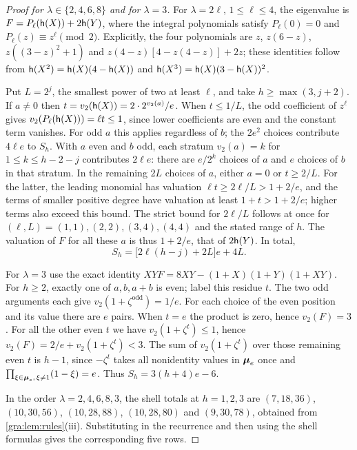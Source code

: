 \begin{proof}[Proof for $\lambda\in\{2,4,6,8\}$ and for $\lambda=3$]
For $\lambda=2\ell$, $1\le\ell\le4$, the eigenvalue is
$F=P_\ell(\mathsf{h}(X))+2\mathsf{h}(Y)$, where the integral polynomials satisfy
$P_\ell(0)=0$ and $P_\ell(z)\equiv z^\ell\pmod2$. Explicitly, the four
polynomials are $z$, $z(6-z)$, $z((3-z)^2+1)$ and $z(4-z)[4-z(4-z)]+2z$;
these identities follow from $\mathsf{h}(X^2)=\mathsf{h}(X)(4-\mathsf{h}(X))$ and
$\mathsf{h}(X^3)=\mathsf{h}(X)(3-\mathsf{h}(X))^2$.

Put $L=2^j$, the smallest power of two at least $\ell$, and take
$h\ge\max(3,j+2)$. If $a\ne0$ then
$t=v_2(\mathsf{h}(X))=2\cdot2^{v_2(a)}/e$. When $t\le1/L$, the odd coefficient
of $z^\ell$ gives $v_2(P_\ell(\mathsf{h}(X)))=\ell t\le1$, since lower
coefficients are even and the constant term vanishes. For odd $a$ this
applies regardless of $b$; the $2e^2$ choices contribute $4\ell e$ to
$S_h$. With $a$ even and $b$ odd, each stratum $v_2(a)=k$ for
$1\le k\le h-2-j$ contributes $2\ell e$: there are $e/2^k$ choices of $a$
and $e$ choices of $b$ in that stratum. In the remaining $2L$ choices of
$a$, either $a=0$ or $t\ge2/L$. For the latter, the leading monomial has
valuation $\ell t\ge2\ell/L>1+2/e$, and the terms of smaller positive
degree have valuation at least $1+t>1+2/e$; higher terms also exceed this
bound. The strict bound for $2\ell/L$ follows at once for
$(\ell,L)=(1,1),(2,2),(3,4),(4,4)$ and the stated range of $h$. The
valuation of $F$ for all these $a$ is thus $1+2/e$, that of $2\mathsf{h}(Y)$.
In total,
\[
 S_h=\bigl[2\ell(h-j)+2L\bigr]e+4L .
\]

For $\lambda=3$ use the exact identity
$XYF=8XY-(1+X)(1+Y)(1+XY)$. For $h\ge2$, exactly one of $a,b,a+b$ is even;
label this residue $t$. The two odd arguments each give
$v_2(1+\zeta^{\mathrm{odd}})=1/e$. For each choice of the even position and
its value there are $e$ pairs. When $t=e$ the product is zero, hence
$v_2(F)=3$. For all the other even $t$ we have $v_2(1+\zeta^t)\le1$, hence
$v_2(F)=2/e+v_2(1+\zeta^t)<3$. The sum of $v_2(1+\zeta^t)$ over those
remaining even $t$ is $h-1$, since $-\zeta^t$ takes all nonidentity values
in $\boldsymbol{\mu}_e$ once and $\prod_{\xi\in\boldsymbol{\mu}_e,\,\xi\ne1}(1-\xi)=e$. Thus
$S_h=3(h+4)e-6$.

In the order $\lambda=2,4,6,8,3$, the shell totals at $h=1,2,3$ are
$(7,18,36)$, $(10,30,56)$, $(10,28,88)$, $(10,28,80)$ and $(9,30,78)$,
obtained from \cref{gra:lem:rules}(iii). Substituting in the recurrence and
then using the shell formulas gives the corresponding five rows.
\end{proof}

